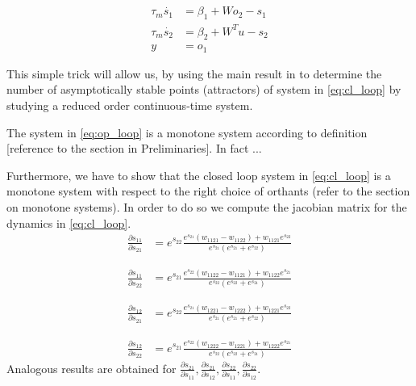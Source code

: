 \begin{equation}
\begin{aligned}
\tau_m \dot{s_1} &= \beta_{1} + Wo_{2}-s_{1} \\
\tau_m \dot{s_2} &= \beta_{2} + W^{T}u-s_{2} \\
y & =  o_1
\end{aligned}
\label{eq:op_loop}
\end{equation}

This simple trick will allow us, by using the main result in \cite{enciso2005monotone} to determine the number of asymptotically stable points (attractors) of system in \eqref{eq:cl_loop} by studying a reduced order continuous-time system.

The system in \eqref{eq:op_loop} is a monotone system according to definition [reference to the section in Preliminaries]. In fact ...

Furthermore, we have to show that   the closed loop system in \eqref{eq:cl_loop} is a monotone system with respect to the right choice of orthants (refer to the section on monotone systems). In order to do so we compute the jacobian matrix for the dynamics in \eqref{eq:cl_loop}.
\begin{equation}
\begin{aligned}
\frac{\partial s_{11}}{\partial s_{21}} &= e^{s_{22}} \frac{e^{s_{21}}(w_{1121} - w_{1122}) + w_{1121}e^{s_{22}}    }{e^{s_{21}}(e^{s_{21}}+ e^{s_{22}})} 
\end{aligned}
\label{eq:jac_s1121}
\end{equation}


\begin{equation}
\begin{aligned}
\frac{\partial s_{11}}{\partial s_{22}} &= e^{s_{21}} \frac{e^{s_{22}}(w_{1122} - w_{1121}) + w_{1122}e^{s_{21}}    }{e^{s_{22}}(e^{s_{22}}+ e^{s_{21}})} 
\end{aligned}
\label{eq:jac_s1122}
\end{equation}


\begin{equation}
\begin{aligned}
\frac{\partial s_{12}}{\partial s_{21}} &= e^{s_{22}} \frac{e^{s_{21}}(w_{1221} - w_{1222}) + w_{1221}e^{s_{22}}    }{e^{s_{21}}(e^{s_{21}}+ e^{s_{22}})} 
\end{aligned}
\label{eq:jac_s1221}
\end{equation}


\begin{equation}
\begin{aligned}
\frac{\partial s_{12}}{\partial s_{22}} &= e^{s_{21}} \frac{e^{s_{22}}(w_{1222} - w_{1221}) + w_{1222}e^{s_{21}}    }{e^{s_{22}}(e^{s_{22}}+ e^{s_{21}})} 
\end{aligned}
\label{eq:jac_s1222}
\end{equation}
Analogous results are obtained for $\frac{\partial s_{21}}{\partial s_{11}}, \frac{\partial s_{21}}{\partial s_{12}}, \frac{\partial s_{22}}{\partial s_{11}}, \frac{\partial s_{22}}{\partial s_{12}}$. 

